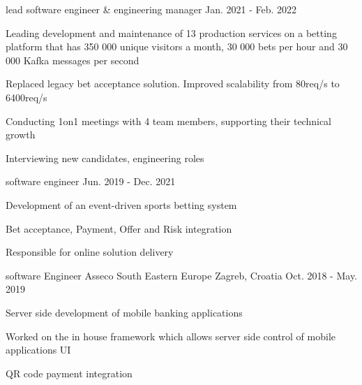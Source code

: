 \begin{cventries}
  \cventry
    {lead software engineer \& engineering manager} %
    {} %
    {} %
    {Jan. 2021 - Feb. 2022} %
    {
      \begin{cvitems} %
        \item {Leading development and maintenance of 13 production services on a betting platform that has 350 000 unique visitors a month, 30 000 bets per hour and 30 000 Kafka messages per second}
        \item {Replaced legacy bet acceptance solution. Improved scalability from 80req/s to 6400req/s}
        \item {Conducting 1on1 meetings with 4 team members, supporting their technical growth}
        \item {Interviewing new candidates, engineering roles}
      \end{cvitems}
    }

  \cventry
    {software engineer} %
    {} %
    {} %
    {Jun. 2019 - Dec. 2021} %
    {
      \begin{cvitems} %
        \item {Development of an event-driven sports betting system}
        \item {Bet acceptance, Payment, Offer and Risk integration}
        \item {Responsible for online solution delivery}
      \end{cvitems}
    }

  \cventry
    {software Engineer} %
    {Asseco South Eastern Europe} %
    {Zagreb, Croatia} %
    {Oct. 2018 - May. 2019} %
    {
      \begin{cvitems} %
        \item {Server side development of mobile banking applications}
        \item {Worked on the in house framework which allows server side control of mobile applications UI}
        \item {QR code payment integration}
      \end{cvitems}
    }

\end{cventries}
